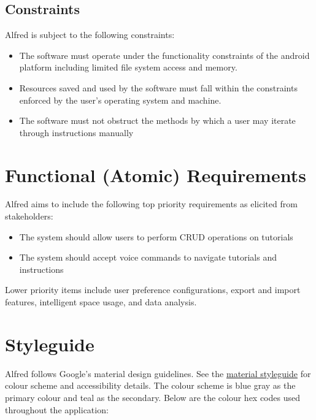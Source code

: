 \documentclass[12pt]{article}
\begin{document}
\subsection{Constraints}

Alfred is subject to the following constraints:

\begin{itemize}

\item The software must operate under the functionality constraints of the android platform including limited file system access and memory.
\item Resources saved and used by the software must fall within the constraints enforced by the user's operating system and machine.
\item The software must not obstruct the methods by which a user may iterate through instructions manually

\end{itemize}

\section{Functional (Atomic) Requirements}

Alfred aims to include the following top priority requirements as elicited from stakeholders:

\begin{itemize}[noitemsep]
\item The system should allow users to perform CRUD operations on tutorials
\item The system should accept voice commands to navigate tutorials and instructions
\end{itemize}

Lower priority items include user preference configurations, export and import features, intelligent space usage, and data analysis.

\section{Styleguide}

Alfred follows Google's material design guidelines. See the \href{https://material.io/color/#!/?view.left=0&view.right=0&primary.color=455A64&secondary.color=80CBC4}{material styleguide} for colour scheme and accessibility details. The colour scheme is blue gray as the primary colour and teal as the secondary. Below are the colour hex codes used throughout the application:
\end{document}
